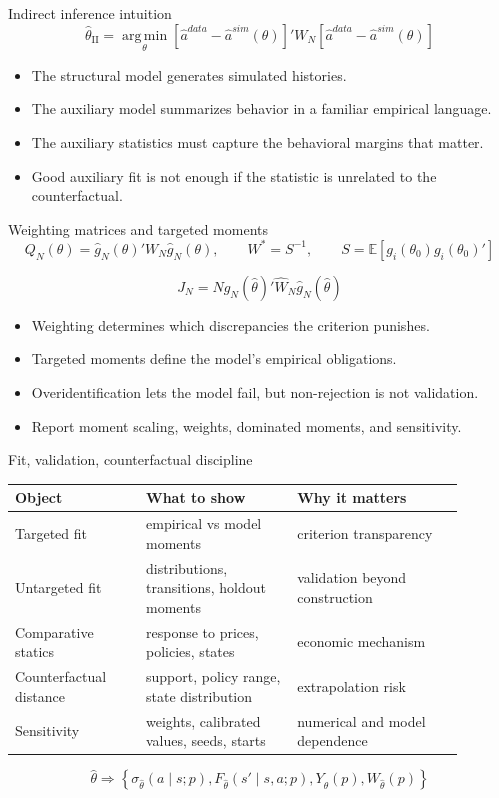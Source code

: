 \documentclass[aspectratio=169,11pt]{beamer}
\newcommand{\E}{\mathbb{E}}
\newcommand{\1}{\mathbf{1}}
\newcommand{\argmin}{\operatorname*{arg\,min}}
\begin{document}
\begin{frame}{Indirect inference intuition}
\[
\widehat\theta_{\mathrm{II}}
=
\argmin_\theta
\left[
\widehat a^{data}
-
\widehat a^{sim}(\theta)
\right]'
W_N
\left[
\widehat a^{data}
-
\widehat a^{sim}(\theta)
\right]
\]

\begin{itemize}
    \item The structural model generates simulated histories.
    \item The auxiliary model summarizes behavior in a familiar empirical language.
    \item The auxiliary statistics must capture the behavioral margins that matter.
    \item Good auxiliary fit is not enough if the statistic is unrelated to the counterfactual.
\end{itemize}
\end{frame}

\begin{frame}{Weighting matrices and targeted moments}
\small
\[
Q_N(\theta)=\widehat g_N(\theta)' W_N \widehat g_N(\theta),
\qquad
W^\ast=S^{-1},
\qquad
S=\E[g_i(\theta_0)g_i(\theta_0)']
\]

\[
J_N
=
N\widehat g_N(\widehat\theta)'
\widehat W_N
\widehat g_N(\widehat\theta)
\]

\begin{itemize}
    \item Weighting determines which discrepancies the criterion punishes.
    \item Targeted moments define the model's empirical obligations.
    \item Overidentification lets the model fail, but non-rejection is not validation.
    \item Report moment scaling, weights, dominated moments, and sensitivity.
\end{itemize}
\end{frame}

\begin{frame}{Fit, validation, counterfactual discipline}
\small
\begin{tabular}{p{0.26\linewidth} p{0.30\linewidth} p{0.33\linewidth}}
\toprule
Object & What to show & Why it matters \\
\midrule
Targeted fit & empirical vs model moments & criterion transparency \\
Untargeted fit & distributions, transitions, holdout moments & validation beyond construction \\
Comparative statics & response to prices, policies, states & economic mechanism \\
Counterfactual distance & support, policy range, state distribution & extrapolation risk \\
Sensitivity & weights, calibrated values, seeds, starts & numerical and model dependence \\
\bottomrule
\end{tabular}

\[
\widehat\theta
\Longrightarrow
\left\{
\sigma_{\widehat\theta}(a\mid s;p),
F_{\widehat\theta}(s'\mid s,a;p),
Y_{\widehat\theta}(p),
W_{\widehat\theta}(p)
\right\}
\]
\end{frame}
\end{document}
